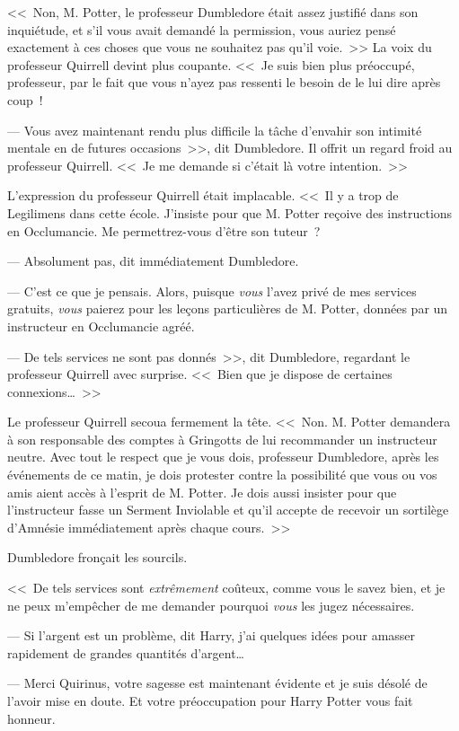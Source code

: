 <<~Non, M. Potter, le professeur Dumbledore était assez justifié dans son inquiétude, et s'il vous avait demandé la permission, vous auriez pensé exactement à ces choses que vous ne souhaitez pas qu'il voie.~>> La voix du professeur Quirrell devint plus coupante. <<~Je suis bien plus préoccupé, professeur, par le fait que vous n'ayez pas ressenti le besoin de le lui dire après coup~!

--- Vous avez maintenant rendu plus difficile la tâche d'envahir son intimité mentale en de futures occasions~>>, dit Dumbledore. Il offrit un regard froid au professeur Quirrell. <<~Je me demande si c'était là votre intention.~>>

L'expression du professeur Quirrell était implacable. <<~Il y a trop de Legilimens dans cette école. J'insiste pour que M. Potter reçoive des instructions en Occlumancie. Me permettrez-vous d'être son tuteur~?

--- Absolument pas, dit immédiatement Dumbledore.

--- C'est ce que je pensais. Alors, puisque \emph{vous} l'avez privé de mes services gratuits, \emph{vous} paierez pour les leçons particulières de M. Potter, données par un instructeur en Occlumancie agréé.

--- De tels services ne sont pas donnés~>>, dit Dumbledore, regardant le professeur Quirrell avec surprise. <<~Bien que je dispose de certaines connexions…~>>

Le professeur Quirrell secoua fermement la tête. <<~Non. M. Potter demandera à son responsable des comptes à Gringotts de lui recommander un instructeur neutre. Avec tout le respect que je vous dois, professeur Dumbledore, après les événements de ce matin, je dois protester contre la possibilité que vous ou vos amis aient accès à l'esprit de M. Potter. Je dois aussi insister pour que l'instructeur fasse un Serment Inviolable et qu'il accepte de recevoir un sortilège d'Amnésie immédiatement après chaque cours.~>>

Dumbledore fronçait les sourcils.

<<~De tels services sont \emph{extrêmement} coûteux, comme vous le savez bien, et je ne peux m'empêcher de me demander pourquoi \emph{vous} les jugez nécessaires.

--- Si l'argent est un problème, dit Harry, j'ai quelques idées pour amasser rapidement de grandes quantités d'argent…

--- Merci Quirinus, votre sagesse est maintenant évidente et je suis désolé de l'avoir mise en doute. Et votre préoccupation pour Harry Potter vous fait honneur.

